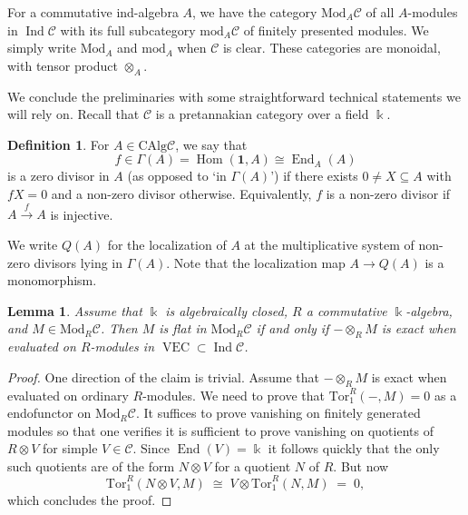 \documentclass[11pt]{amsart}
\def\End{\operatorname{End}}
\def\Ind{\operatorname{Ind}}
\def\Hom{\operatorname{Hom}}
\def\cC{\mathscr{C}}
\def\bk{\Bbbk}
\def\mod{\mathrm{ mod}}
\def\VEC{\operatorname{VEC}}
\def\Tor{\mathrm{Tor}}
\def\Mod{\mathrm{Mod}}
\def\sub{\subseteq}
\def\xto{\xrightarrow}
\newtheorem{lemma}[thm]{Lemma}
\theoremstyle{definition}
\newtheorem{definition}[thm]{Definition}
\theoremstyle{remark}
\numberwithin{equation}{section}
\newcommand{\unit}{\mathbf{1}}
\newcommand{\CAlg}{\mathrm{CAlg}}
\begin{document}
For a commutative ind-algebra $A$, we have the category $\Mod_A{\cC}$ of all $A$-modules in $\Ind\cC$ with its
full subcategory $\mod_A{\cC}$ of finitely presented  modules.  We simply write $\Mod_A$ and $\mod_A$ when $\cC$ is clear. These categories are monoidal, with tensor product $\otimes_A$. 


We conclude the preliminaries with some straightforward technical statements we will rely on. Recall that $\cC$ is a pretannakian category over a field $\bk$.



\begin{definition} For $A\in\CAlg\cC$,
    we say that \[f\in \Gamma(A)=\Hom(\unit,A)\cong\End_A(A)\] is a zero divisor in $A$ (as opposed to `in $\Gamma(A)$') if there exists $0\not=X\sub A$ with $fX=0$ and a non-zero divisor otherwise.  Equivalently, $f$ is a non-zero divisor if $A\xto{f}A$ is injective.
\end{definition}

   We write $Q(A)$ for the localization of $A$ at the multiplicative system of non-zero divisors lying in $\Gamma(A)$.  Note that the localization map $A\to Q(A)$ is a monomorphism. 

\begin{lemma}\label{lem flat ordinary module}Assume that $\bk$ is algebraically closed, $R$ a commutative $\bk$-algebra, and $M\in\Mod_R\cC$. Then $M$ is flat in $\Mod_R\cC$ if and only if $-\otimes_RM$ is exact when evaluated on $R$-modules in $\VEC\subset \Ind\cC$.
\end{lemma}
\begin{proof}
    One direction of the claim is trivial. Assume that $-\otimes_RM$ is exact when evaluated on ordinary $R$-modules. We need to prove that $\Tor_1^R(-,M)=0$ as a endofunctor on $\Mod_R\cC$. It suffices to prove vanishing on finitely generated modules so that one verifies it is sufficient to prove vanishing on quotients of $R\otimes V$ for simple $V\in\cC$. Since $\End(V)=\bk$ it follows quickly that the only such quotients are of the form $N\otimes V$ for a quotient $N$ of $R$. But now 
    \[\Tor_1^R(N\otimes V,M)\;\cong\;V\otimes \Tor_1^R(N,M)\;=\;0,\]
    which concludes the proof.
\end{proof}
\end{document}

